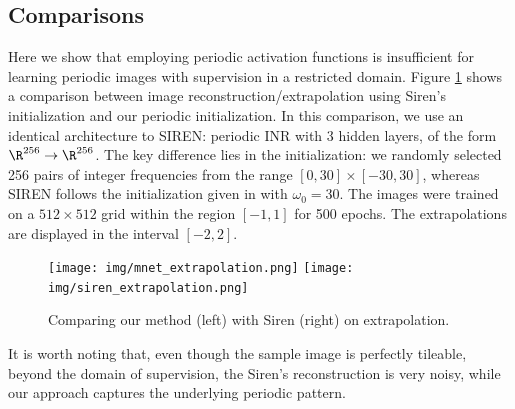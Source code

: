 






\subsection{Comparisons}

Here we show that employing periodic activation functions is insufficient for learning periodic images with supervision in a restricted domain. Figure \ref{f:comparison_siren} shows a comparison between image reconstruction/extrapolation using Siren's initialization and our periodic initialization. In this comparison, we use an identical architecture to SIREN: periodic INR with 3 hidden layers, of the form $\R^{256}\to \R^{256}$. The key difference lies in the initialization: we randomly selected 256 pairs of integer frequencies from the range $[0, 30]\times[-30, 30]$, whereas SIREN follows the initialization given in \cite{sitzmann2019siren} with $\omega_0=30$. The images were trained on a $512\times512$ grid within the region $[-1, 1]$ for 500 epochs. The extrapolations are displayed in the interval $[-2, 2]$.


\begin{figure}[!h]
\centering
\texttt{[image: img/mnet\_extrapolation.png]}
\texttt{[image: img/siren\_extrapolation.png]}
\vspace{-0.4cm}
\caption{Comparing our method (left) with Siren (right) on extrapolation.}
\label{f:comparison_siren}
\end{figure}

It is worth noting that, even though the sample image is perfectly tileable, beyond the domain of supervision, the Siren's reconstruction is very noisy, while our approach captures the underlying periodic pattern. 

